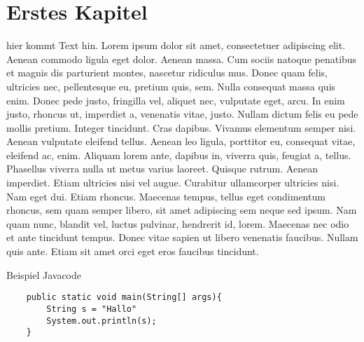 \documentclass[11pt]{article}
\begin{document}

\tableofcontents
\newpage
\listoffigures
\newpage
\renewcommand*{\listoflistingscaption}{Listingverzeichnis}
\listoflistings
\newpage

\section{Erstes Kapitel}
hier kommt Text hin.
Lorem ipsum dolor sit amet, consectetuer adipiscing elit. Aenean commodo ligula eget dolor. Aenean massa. Cum sociis natoque penatibus et magnis dis parturient montes, nascetur ridiculus mus. Donec quam felis, ultricies nec, pellentesque eu, pretium quis, sem. Nulla consequat massa quis enim. Donec pede justo, fringilla vel, aliquet nec, vulputate eget, arcu. In enim justo, rhoncus ut, imperdiet a, venenatis vitae, justo. Nullam dictum felis eu pede mollis pretium. Integer tincidunt. Cras dapibus. Vivamus elementum semper nisi. Aenean vulputate eleifend tellus. Aenean leo ligula, porttitor eu, consequat vitae, eleifend ac, enim. Aliquam lorem ante, dapibus in, viverra quis, feugiat a, tellus. Phasellus viverra nulla ut metus varius laoreet. Quisque rutrum. Aenean imperdiet. Etiam ultricies nisi vel augue. Curabitur ullamcorper ultricies nisi. Nam eget dui. Etiam rhoncus. Maecenas tempus, tellus eget condimentum rhoncus, sem quam semper libero, sit amet adipiscing sem neque sed ipsum. Nam quam nunc, blandit vel, luctus pulvinar, hendrerit id, lorem. Maecenas nec odio et ante tincidunt tempus. Donec vitae sapien ut libero venenatis faucibus. Nullam quis ante. Etiam sit amet orci eget eros faucibus tincidunt.

\begin{listing}[H]
    \caption{Beispiel Javacode}
    \label{lst:mein_quelltext}
    \begin{verbatim}
    public static void main(String[] args){
        String s = "Hallo"
        System.out.println(s);
    }
    \end{verbatim}
\end{listing}
\end{document}
